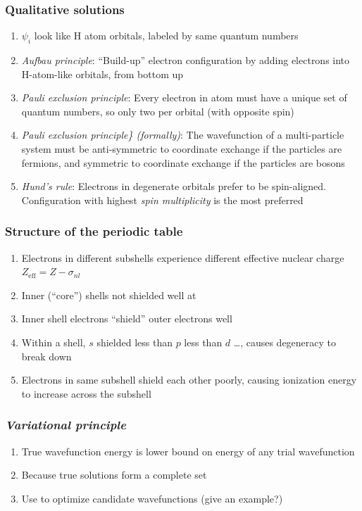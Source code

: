 \documentclass[11pt]{article}
\begin{document}
\subsubsection{Qualitative solutions}
\label{sec:orgc3e949e}
\begin{enumerate}
\item \(\psi_i\) look like H atom orbitals,  labeled by same quantum numbers
\item \emph{Aufbau principle}: ``Build-up'' electron configuration by adding electrons into H-atom-like orbitals, from bottom up
\item \emph{Pauli exclusion principle}: Every electron in atom must have a unique set of quantum numbers, so only two per orbital (with opposite spin)
\item \emph{Pauli exclusion principle\} (formally)}: The wavefunction of a multi-particle system must be anti-symmetric to coordinate exchange if the particles are fermions, and symmetric to coordinate exchange if the particles are bosons
\item \emph{Hund's rule}: Electrons in degenerate orbitals prefer to be spin-aligned.  Configuration with highest \emph{spin multiplicity} is the most preferred
\end{enumerate}
\subsubsection{Structure of the periodic table}
\label{sec:org0c7480b}
\begin{enumerate}
\item Electrons in different subshells experience different effective nuclear charge \(Z_\mathrm{eff} = Z - \sigma_{nl}\)
\item Inner (``core'') shells not shielded well at
\item Inner shell electrons ``shield'' outer electrons well
\item Within a shell, \(s\) shielded less than \(p\) less than \(d\) \ldots{}, causes degeneracy to break down
\item Electrons in same subshell shield each other poorly, causing ionization energy to increase across the subshell
\end{enumerate}
\subsubsection{\emph{Variational principle}}
\label{sec:org1f87c9c}
\begin{enumerate}
\item True wavefunction energy is lower bound on energy of any trial wavefunction
\item Because true solutions form a complete set
\item Use to optimize candidate wavefunctions (give an example?)
\end{enumerate}
\end{document}
